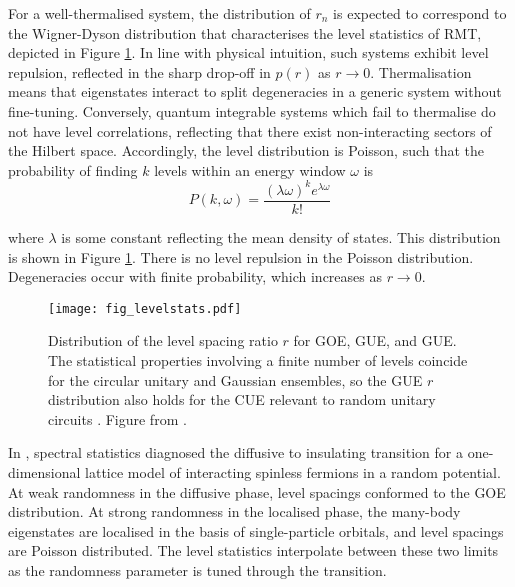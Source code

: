 \documentclass[10pt]{article}
\begin{document}
For a well-thermalised system, the distribution of $r_n$ is expected to correspond to the Wigner-Dyson distribution that characterises the level statistics of RMT, depicted in Figure \ref{fig_rmtrs}. In line with physical intuition, such systems exhibit level repulsion, reflected in the sharp drop-off in $p(r)$ as $r \rightarrow 0$. Thermalisation means that eigenstates interact to split degeneracies in a generic system without fine-tuning. Conversely, quantum integrable systems which fail to thermalise do not have level correlations, reflecting that there exist non-interacting sectors of the Hilbert space. Accordingly, the level distribution is Poisson, such that the probability of finding $k$ levels within an energy window $\omega$ is 
\begin{equation}
P(k,\omega) = \frac{(\lambda\omega)^k e^{\lambda\omega}}{k!}
\end{equation}

where $\lambda$ is some constant reflecting the mean density of states. This distribution is shown in Figure \ref{fig_rmtrs}. There is no level repulsion in the Poisson distribution. Degeneracies occur with finite probability, which increases as $r \rightarrow 0$.  

\begin{figure}
\centering
\texttt{[image: fig\_levelstats.pdf]}
\caption{Distribution of the level spacing ratio $r$ for GOE, GUE, and GUE. The statistical properties involving a finite number of levels coincide for the circular unitary and Gaussian ensembles, so the GUE $r$ distribution also holds for the CUE relevant to random unitary circuits \cite{mehta2004random}. Figure from \cite{atas2013distribution}.}
\label{fig_rmtrs}
\end{figure}


In \cite{oganesyan2007localization}, spectral statistics diagnosed the diffusive to insulating transition for a one-dimensional lattice model of interacting spinless fermions in a random potential. At weak randomness in the diffusive phase, level spacings conformed to the GOE distribution. At strong randomness in the localised phase, the many-body eigenstates are localised in the basis of single-particle orbitals, and level spacings are Poisson distributed. The level statistics interpolate between these two limits as the randomness parameter is tuned through the transition.
\end{document}
